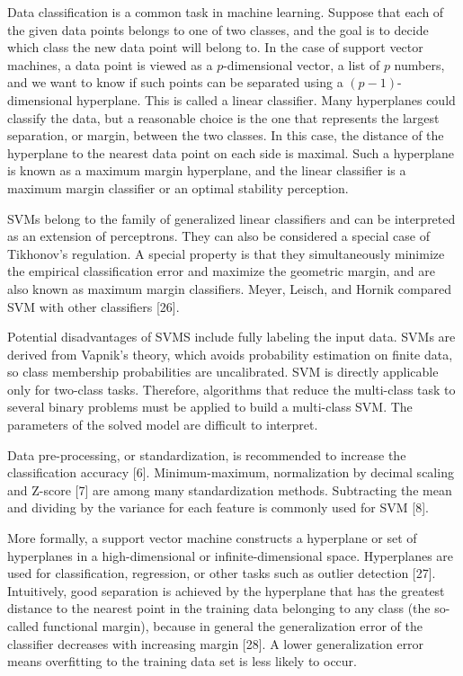 \documentclass[preprint,12pt]{elsarticle}
\begin{document}
Data classification is a common task in machine learning. Suppose that each of the given data points belongs to one of two classes, and the goal is to decide which class the new data point will belong to. In the case of support vector machines, a data point is viewed as a $p$-dimensional vector, a list of $p$ numbers, and we want to know if such points can be separated using a $(p-1)$-dimensional hyperplane. This is called a linear classifier. Many hyperplanes could classify the data, but a reasonable choice is the one that represents the largest separation, or margin, between the two classes. In this case, the distance of the hyperplane to the nearest data point on each side is maximal. Such a hyperplane is known as a maximum margin hyperplane, and the linear classifier is a maximum margin classifier or an optimal stability perception.

SVMs belong to the family of generalized linear classifiers and can be interpreted as an extension of perceptrons. They can also be considered a special case of Tikhonov's regulation. A special property is that they simultaneously minimize the empirical classification error and maximize the geometric margin, and are also known as maximum margin classifiers. Meyer, Leisch, and Hornik compared SVM with other classifiers [26].

Potential disadvantages of SVMS include fully labeling the input data. SVMs are derived from Vapnik's theory, which avoids probability estimation on finite data, so class membership probabilities are uncalibrated. SVM is directly applicable only for two-class tasks. Therefore, algorithms that reduce the multi-class task to several binary problems must be applied to build a multi-class SVM. The parameters of the solved model are difficult to interpret.

Data pre-processing, or standardization, is recommended to increase the classification accuracy [6]. Minimum-maximum, normalization by decimal scaling and Z-score [7] are among many standardization methods. Subtracting the mean and dividing by the variance for each feature is commonly used for SVM [8].

More formally, a support vector machine constructs a hyperplane or set of hyperplanes in a high-dimensional or infinite-dimensional space. Hyperplanes are used for classification, regression, or other tasks such as outlier detection [27]. Intuitively, good separation is achieved by the hyperplane that has the greatest distance to the nearest point in the training data belonging to any class (the so-called functional margin), because in general the generalization error of the classifier decreases with increasing margin [28]. A lower generalization error means overfitting to the training data set is less likely to occur.
\end{document}
